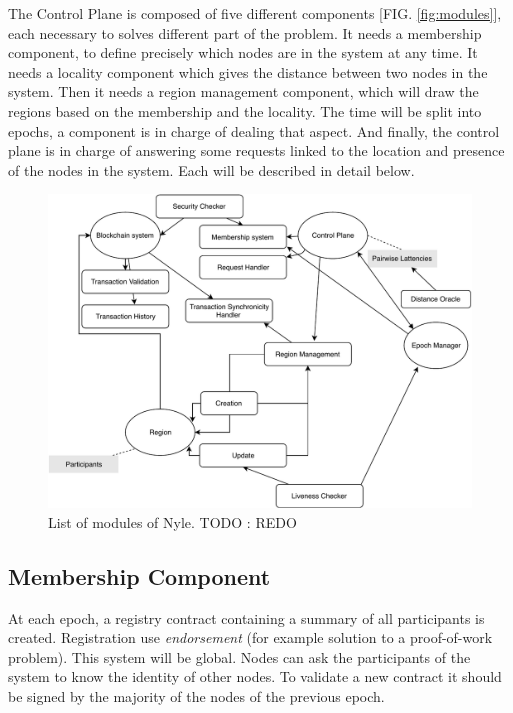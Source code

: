 \documentclass[a4paper,11pt,oneside]{report}
\begin{document}
The Control Plane is composed of five different components [FIG.
\autoref{fig:modules}], each necessary to solves different part of the problem. It
needs a membership component, to define precisely which nodes are in the system
at any time. It needs a locality component which gives the distance between two
nodes in the system. Then it needs a region management component, which will
draw the regions based on the membership and the locality. The time will be
split into epochs, a component is in charge of dealing that aspect. And
finally, the control plane is in charge of answering some requests linked to
the location and presence of the nodes in the system. Each will be described in
detail below. 

\begin{figure}[!h]
\centering
\includegraphics[width=400pt]{figures/Nyle_components}
\caption{List of modules of Nyle.  \color{red} TODO : REDO \color{black}}
\label{fig:modules}
\end{figure}

\subsection{Membership Component}

At each epoch, a registry contract containing a summary of all participants is
created. Registration use \textit{endorsement} (for example solution to a proof-of-work
problem). This system will be global. Nodes can ask the participants of the
system to know the identity of other nodes. To validate a new contract it
should be signed by the majority of the nodes of the previous epoch.
\end{document}
